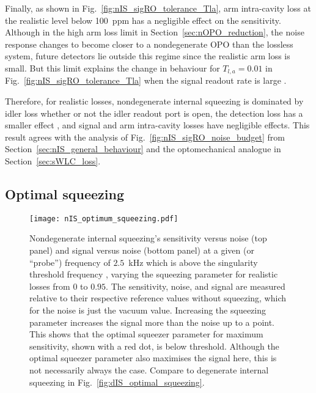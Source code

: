Finally, as shown in Fig.~\ref{fig:nIS_sigRO_tolerance_Tla}, arm intra-cavity loss at the realistic level below 100~ppm has a negligible  effect on the sensitivity. Although in the high arm loss limit in Section~\ref{sec:nOPO_reduction}, the noise response changes to become closer to a nondegenerate OPO than the lossless system, future detectors lie outside this regime since the realistic arm loss is small. 
But this limit explains the change in behaviour for $T_{l,a}=0.01$  in Fig.~\ref{fig:nIS_sigRO_tolerance_Tla} when the signal readout rate is large .

Therefore, for realistic losses, nondegenerate internal squeezing is dominated by idler loss whether or not the idler readout port is open, the detection loss has a smaller effect , and signal and arm intra-cavity losses have negligible effects. This result agrees with the analysis of Fig.~\ref{fig:nIS_sigRO_noise_budget} from Section~\ref{sec:nIS_general_behaviour}  and the optomechanical analogue in Section~\ref{sec:sWLC_loss}.


\subsection{Optimal squeezing}
\label{sec:nIS_optimal_squeezing}

\begin{figure}
	\centering
	\texttt{[image: nIS\_optimum\_squeezing.pdf]}
	\caption{  Nondegenerate internal squeezing's sensitivity versus noise (top panel) and signal versus noise (bottom panel) at a given (or ``probe'') frequency of $2.5$~kHz which is above the singularity threshold frequency , varying the squeezing parameter for realistic losses from $0$ to $0.95$. The sensitivity, noise, and signal are measured relative to their respective reference values without squeezing, which for the noise is just the vacuum value. Increasing the squeezing parameter increases the signal more than the noise up to a point. This shows that the optimal squeezer parameter for maximum sensitivity, shown with a red dot, is below threshold. Although the optimal squeezer parameter also maximises the signal here, this is not necessarily always the case. Compare to degenerate internal squeezing in Fig.~\ref{fig:dIS_optimal_squeezing}.}
	\label{fig:nIS_optimum_squeezing}
\end{figure}

